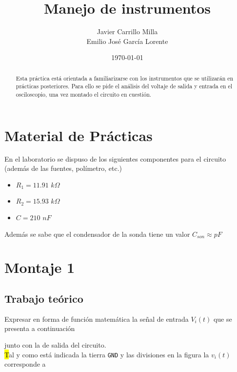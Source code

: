 \documentclass[a4paper,10pt]{article}
\title{Manejo de instrumentos}
\author{Javier Carrillo Milla \\ Emilio Jos\'e Garc\'ia Lorente}
\date{\today}
\begin{document}
\maketitle

\begin{abstract}
Esta pr\'actica est\'a orientada a familiarizarse con los instrumentos que se utilizar\'an en
pr\'acticas posteriores. Para ello se pide el an\'alisis del voltaje de salida y entrada en el
osciloscopio, una vez montado el circuito en cuesti\'on. 
\end{abstract}

\section*{Material de Prácticas}

En el laboratorio se dispuso de los siguientes componentes para el circuito (además de las fuentes, polímetro, etc.)

\begin{itemize}
 \item $R_1 = 11.91$ $k\Omega$
 \item $R_2 = 15.93$ $k\Omega$ 
 \item $C =2 10$ $nF$
\end{itemize}

Además se sabe que el condensador de la sonda tiene un valor $C_{son} \approx pF$ 

\section{Montaje 1}

\subsection{Trabajo teórico}

Expresar en forma de función matemática la señal de entrada $V_i(t)$ que se presenta a continuación 

\begin{figure}[h!]
\centering
{}
\end{figure}

junto con la de salida del circuito.\\
\hl

Tal y como está indicada la tierra \verb'GND' y las divisiones en la figura la
$v_i(t)$ corresponde a 
\end{document}
